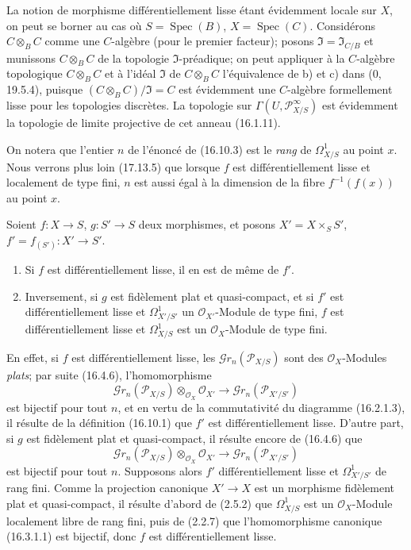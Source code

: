 La notion de morphisme différentiellement lisse étant évidemment locale sur
$X$, on peut se borner au cas où $S=\operatorname{Spec}(B)$,
$X=\operatorname{Spec}(C)$. Considérons $C\otimes_B C$ comme une $C$-algèbre
(pour le premier facteur); posons $\mathfrak{I}=\mathfrak{I}_{C/B}$ et
munissons $C\otimes_B C$ de la topologie $\mathfrak{I}$-préadique; on peut
appliquer à la $C$-algèbre topologique $C\otimes_B C$ et à l'idéal
$\mathfrak{I}$ de $C\otimes_B C$ l'équivalence de b) et c) dans (0, 19.5.4),
puisque $(C\otimes_B C)/\mathfrak{I}=C$ est évidemment une $C$-algèbre
formellement lisse pour les topologies discrètes. La topologie sur
$\Gamma(U,\mathscr{P}_{X/S}^{\infty})$ est évidemment la topologie de limite
projective de cet anneau (16.1.11).

On notera que l'entier $n$ de l'énoncé de (16.10.3) est le \emph{rang} de
$\Omega_{X/S}^1$ au point $x$. Nous verrons plus loin (17.13.5) que lorsque
$f$ est différentiellement lisse et localement de type fini, $n$ est aussi
égal à la dimension de la fibre $f^{-1}(f(x))$ au point $x$.

\begin{proposition}[16.10.4]
\label{IV.16.10.4}
Soient $f:X\to S$, $g:S'\to S$ deux morphismes, et posons
$X'=X\times_S S'$, $f'=f_{(S')}:X'\to S'$.
\begin{enumerate}
  \item[(i)] Si $f$ est différentiellement lisse, il en est de même de $f'$.
  \item[(ii)] Inversement, si $g$ est fidèlement plat et quasi-compact, et si
  $f'$ est différentiellement lisse et $\Omega_{X'/S'}^1$ un
  $\mathcal{O}_{X'}$-Module de type fini, $f$ est différentiellement lisse et
  $\Omega_{X/S}^1$ est un $\mathcal{O}_X$-Module de type fini.
\end{enumerate}
\end{proposition}

En effet, si $f$ est différentiellement lisse, les
$\mathscr{G}r_n(\mathscr{P}_{X/S})$ sont des $\mathcal{O}_X$-Modules
\emph{plats}; par suite (16.4.6), l'homomorphisme
\[
  \mathscr{G}r_n(\mathscr{P}_{X/S})\otimes_{\mathcal{O}_X}\mathcal{O}_{X'}
  \longrightarrow\mathscr{G}r_n(\mathscr{P}_{X'/S'})
\]
est bijectif pour tout $n$, et en vertu de la commutativité du diagramme
(16.2.1.3), il résulte de la définition (16.10.1) que $f'$ est
différentiellement lisse. D'autre part, si $g$ est fidèlement plat et
quasi-compact, il résulte encore de (16.4.6) que
\[
  \mathscr{G}r_n(\mathscr{P}_{X/S})\otimes_{\mathcal{O}_X}\mathcal{O}_{X'}
  \longrightarrow\mathscr{G}r_n(\mathscr{P}_{X'/S'})
\]
est bijectif pour tout $n$. Supposons alors $f'$ différentiellement lisse et
$\Omega_{X'/S'}^1$ de rang fini. Comme la projection canonique $X'\to X$ est
un morphisme fidèlement plat et quasi-compact, il résulte d'abord de (2.5.2)
que $\Omega_{X/S}^1$ est un $\mathcal{O}_X$-Module localement libre de rang
fini, puis de (2.2.7) que l'homomorphisme canonique (16.3.1.1) est bijectif,
donc $f$ est différentiellement lisse.

